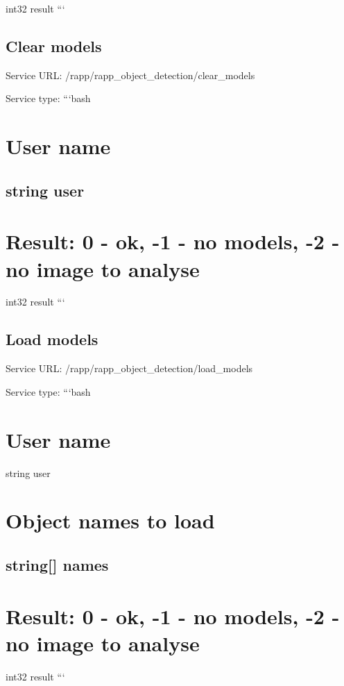 int32 result ```

\subsection*{Clear models}

Service U\-R\-L\-: {\ttfamily /rapp/rapp\-\_\-object\-\_\-detection/clear\-\_\-models}

Service type\-: ```bash \section*{User name}

\subsection*{string user }

\section*{Result\-: 0 -\/ ok, -\/1 -\/ no models, -\/2 -\/ no image to analyse}

int32 result ```

\subsection*{Load models}

Service U\-R\-L\-: {\ttfamily /rapp/rapp\-\_\-object\-\_\-detection/load\-\_\-models}

Service type\-: ```bash \section*{User name}

string user \section*{Object names to load}

\subsection*{string\mbox{[}\mbox{]} names }

\section*{Result\-: 0 -\/ ok, -\/1 -\/ no models, -\/2 -\/ no image to analyse}

int32 result ```


